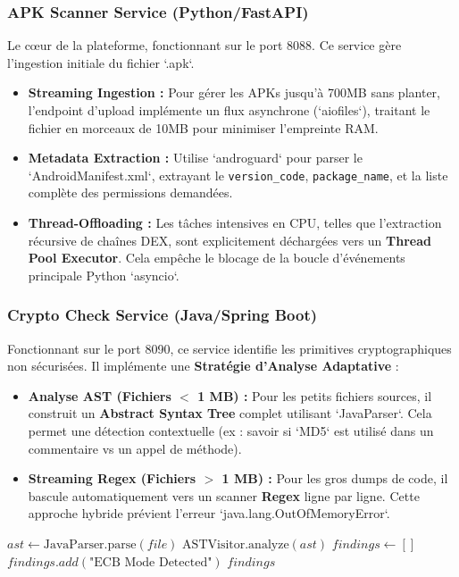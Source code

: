 \documentclass[
  journal=largetwo,
  manuscript=article-type,
  year=2025,
  volume=1,
]{cup-journal}
\begin{document}
\subsubsection{APK Scanner Service (Python/FastAPI)}
Le cœur de la plateforme, fonctionnant sur le port 8088. Ce service gère l'ingestion initiale du fichier `.apk`.
\begin{itemize}
    \item \textbf{Streaming Ingestion :} Pour gérer les APKs jusqu'à 700MB sans planter, l'endpoint d'upload implémente un flux asynchrone (`aiofiles`), traitant le fichier en morceaux de 10MB pour minimiser l'empreinte RAM.
    \item \textbf{Metadata Extraction :} Utilise `androguard` pour parser le `AndroidManifest.xml`, extrayant le \texttt{version\_code}, \texttt{package\_name}, et la liste complète des permissions demandées.
    \item \textbf{Thread-Offloading :} Les tâches intensives en CPU, telles que l'extraction récursive de chaînes DEX, sont explicitement déchargées vers un \textbf{Thread Pool Executor}. Cela empêche le blocage de la boucle d'événements principale Python `asyncio`.
\end{itemize}

\subsubsection{Crypto Check Service (Java/Spring Boot)}
Fonctionnant sur le port 8090, ce service identifie les primitives cryptographiques non sécurisées. Il implémente une \textbf{Stratégie d'Analyse Adaptative} :
\begin{itemize}
    \item \textbf{Analyse AST (Fichiers $<$ 1 MB) :} Pour les petits fichiers sources, il construit un \textbf{Abstract Syntax Tree} complet utilisant `JavaParser`. Cela permet une détection contextuelle (ex : savoir si `MD5` est utilisé dans un commentaire vs un appel de méthode).
    \item \textbf{Streaming Regex (Fichiers $>$ 1 MB) :} Pour les gros dumps de code, il bascule automatiquement vers un scanner \textbf{Regex} ligne par ligne. Cette approche hybride prévient l'erreur `java.lang.OutOfMemoryError`.
\end{itemize}

\begin{algorithm}
\caption{Hybrid Crypto Analysis}
\begin{algorithmic}[1]
        \State $ast \leftarrow \text{JavaParser.parse}(file)$
        \State \Return $\text{ASTVisitor.analyze}(ast)$
    \Else
        \State $findings \leftarrow []$
                 \State $findings.add(\text{"ECB Mode Detected"})$
            \EndIf
        \EndWhile
        \Return $findings$
    \EndIf
\EndFunction
\end{algorithmic}
\end{algorithm}
\end{document}

